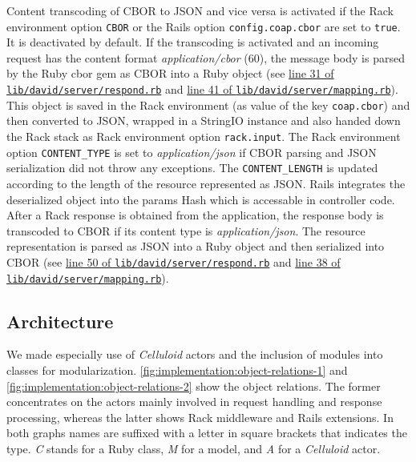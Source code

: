 		Content transcoding of \ac{CBOR} to \ac{JSON} and vice versa is
		activated if the Rack environment option \texttt{CBOR} or the Rails
		option \texttt{config.coap.cbor} are set to \texttt{true}. It is
		deactivated by default. If the transcoding is activated and an incoming
		request has the content format \emph{application/cbor} (60), the
		message body is parsed by the Ruby cbor gem \cite{cbor-gem} as
		\ac{CBOR} into a Ruby object (see
		\href{https://github.com/nning/david/blob/0.4.3/lib/david/server/respond.rb#L31}{line
		31 of \texttt{lib/david/server/respond.rb}} and
		\href{https://github.com/nning/david/blob/0.4.3/lib/david/server/mapping.rb#L41}{line
		41 of \texttt{lib/david/server/mapping.rb}}). This object is saved in
		the Rack environment (as value of the key \texttt{coap.cbor}) and then
		converted to \ac{JSON}, wrapped in a StringIO instance and also handed
		down the Rack stack as Rack environment option \texttt{rack.input}. The
		Rack environment option \texttt{CONTENT\_TYPE} is set to
		\emph{application/json} if \ac{CBOR} parsing and \ac{JSON}
		serialization did not throw any exceptions. The
		\texttt{CONTENT\_LENGTH} is updated according to the length of the
		resource represented as \ac{JSON}. Rails integrates the deserialized
		object into the params Hash which is accessable in controller code.
		After a Rack response is obtained from the application, the response
		body is transcoded to \ac{CBOR} if its content type is
		\emph{application/json}. The resource representation is parsed as
		\ac{JSON} into a Ruby object and then serialized into \ac{CBOR} (see
		\href{https://github.com/nning/david/blob/0.4.3/lib/david/server/respond.rb#L50}{line
		50 of \texttt{lib/david/server/respond.rb}} and
		\href{https://github.com/nning/david/blob/0.4.3/lib/david/server/mapping.rb#L38}{line
		38 of \texttt{lib/david/server/mapping.rb}}).

	\subsection{Architecture}

		We made especially use of \emph{Celluloid} actors and the inclusion of
		modules into classes for modularization.
		\autoref{fig:implementation:object-relations-1} and
		\ref{fig:implementation:object-relations-2} show the object relations.
		The former concentrates on the actors mainly involved in request
		handling and response processing, whereas the latter shows Rack
		middleware and \ac{Rails} extensions. In both graphs names are suffixed
		with a letter in square brackets that indicates the type. \emph{C}
		stands for a Ruby class, \emph{M} for a model, and \emph{A} for a
		\emph{Celluloid} actor.
		
